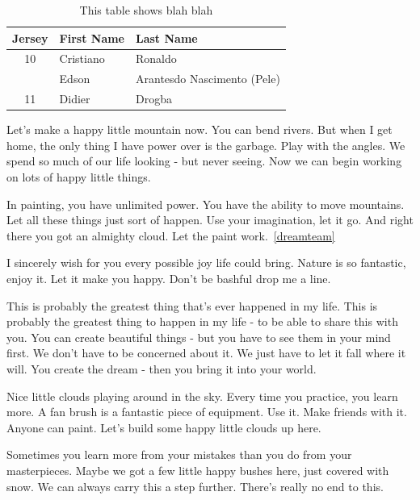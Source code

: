\documentclass[11pt]{article}
\begin{document}
\begin{table}[b]
	\begin{center}
		\begin{tabular}{c||l|p{1in}}
			Jersey & First Name & Last Name                            \\
			\hline\hline
			10     & Cristiano  & Ronaldo                              \\
			\cline{2-3}
			       & Edson      & Arantes\newline do Nascimento (Pele) \\
			\hline
			11     & Didier     & Drogba                               \\
		\end{tabular}
	\end{center}
	\caption{ \label{dreamteam2}
		This table shows blah blah}
\end{table}

Let's make a happy little mountain now. You can bend rivers. But when I get
home, the only thing I have power over is the garbage. Play with the angles. We
spend so much of our life looking - but never seeing. Now we can begin working
on lots of happy little things.

In painting, you have unlimited power. You have the ability to move mountains.
Let all these things just sort of happen. Use your imagination, let it go. And
right there you got an almighty cloud. Let the paint
work.~\ref{dreamteam}

I sincerely wish for you every possible joy life could bring. Nature is so
fantastic, enjoy it. Let it make you happy. Don't be bashful drop me a line.

This is probably the greatest thing that's ever happened in my life. This is
probably the greatest thing to happen in my life - to be able to share this
with you. You can create beautiful things - but you have to see them in your
mind first. We don't have to be concerned about it. We just have to let it fall
where it will. You create the dream - then you bring it into your world.

Nice little clouds playing around in the sky. Every time you practice, you
learn more. A fan brush is a fantastic piece of equipment. Use it. Make friends
with it. Anyone can paint. Let's build some happy little clouds up here.

Sometimes you learn more from your mistakes than you do from your masterpieces.
Maybe we got a few little happy bushes here, just covered with snow. We can
always carry this a step further. There's really no end to this.

\newpage
\listoftables
\listoffigures
\end{document}
